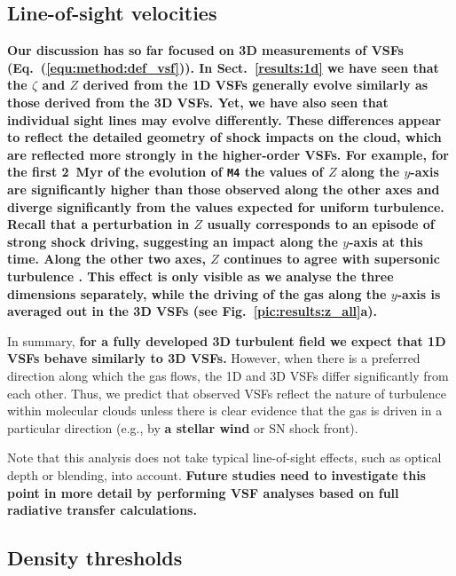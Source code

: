 \subsection{Line-of-sight velocities}\label{discussion:1d}

\textbf{Our discussion has so far focused on 3D measurements of VSFs (Eq.~(\ref{equ:method:def_vsf})).
In Sect.~\ref{results:1d} we have seen that the $\zeta$ and $Z$ derived from the 1D VSFs generally evolve similarly as those derived from the 3D VSFs.
Yet, we have also seen that individual sight lines may evolve differently.
These differences appear to reflect the detailed geometry of shock impacts on the cloud, which are reflected more strongly in the higher-order VSFs.
For example, for the first 2~Myr of the evolution of \texttt{M4} the values of $Z$ along the $y$-axis are significantly higher than those observed along the other axes and diverge significantly from the values expected for uniform turbulence.
Recall that a perturbation in $Z$ usually corresponds to an episode of strong shock driving, suggesting an impact along the $y$-axis at this time. 
Along the other two axes, $Z$ continues to agree with supersonic turbulence \citep{Boldyrev2002}.
This effect is only visible as we analyse the three dimensions separately, while the driving of the gas along the $y$-axis is averaged out in the 3D VSFs (see Fig.~\ref{pic:results:z_all}a).
}

In summary, \textbf{for a fully developed 3D turbulent field we expect that 1D VSFs behave similarly to 3D VSFs.}
However, when there is a preferred direction along which the gas flows, the 1D and 3D VSFs differ significantly from each other. 
Thus, we predict that observed VSFs reflect the nature of turbulence within molecular clouds unless there is clear evidence that the gas is driven in a particular direction (e.g., by \textbf{a stellar wind} or SN shock front).

Note that this analysis does not take typical line-of-sight effects, such as optical depth or blending, into account. 
\textbf{Future studies need to investigate this point in more detail by performing VSF analyses based on full radiative transfer calculations. }



\subsection{Density thresholds}\label{discussion:densthres}



